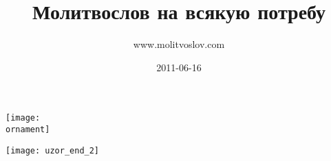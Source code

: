 \documentclass[11pt,oneside]{book}
\title{Молитвослов на всякую потребу}
\author{www.molitvoslov.com}
\date{2011-06-16}
\newcommand{\ornament}{uzor_begin_2}
\newlength\headoff
\newcommand\noparindent{\setlength\parindent{0pt}}
\begin{document}
%

\newlength\savebeforepartskip
\setlength\savebeforepartskip{\cftbeforepartskip}
\setlength\cftbeforepartskip{3pt}


{\noparindent
\vspace*{-\headoff}
\texttt{[image: \\ornament]}}
\setlength\cftbeforepartskip{\savebeforepartskip}
\addtolength\cftbeforechapskip{-5pt}

\tableofcontents

\nopagebreak\bigskip\bigskip\begin{center}\texttt{[image: uzor\_end\_2]}\end{center}

\renewcommand{\ornament}{uzor_begin_5}




\end{document}
